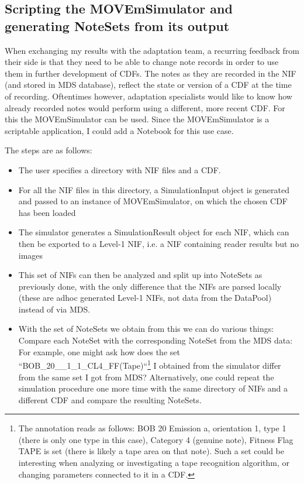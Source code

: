 \subsection{Scripting the MOVEmSimulator and generating NoteSets from its output}
When exchanging my results with the adaptation team, a recurring feedback from their side is that they need to be able to change note records in order to use them in further development of CDFs. The notes as they are recorded in the NIF (and stored in MDS database), reflect the state or version of a CDF at the time of recording. Oftentimes however, adaptation specialists would like to know how already recorded notes would perform using a different, more recent CDF. For this the MOVEmSimulator can be used. Since the MOVEmSimulator is a scriptable application, I could add a Notebook for this use case.\par
The steps are as follows:
\begin{itemize}
\item The user specifies a directory with NIF files and a CDF.
\item For all the NIF files in this directory, a SimulationInput object is generated and passed to an instance of MOVEmSimulator, on which the chosen CDF has been loaded
\item The simulator generates a SimulationResult object for each NIF, which can then be exported to a Level-1 NIF, i.e. a NIF containing reader results but no images
\item This set of NIFs can then be analyzed and split up into NoteSets as previously done, with the only difference that the NIFs are parsed locally (these are adhoc generated Level-1 NIFs, not data from the DataPool) instead of via MDS.
\item With the set of NoteSets we obtain from this we can do various things: Compare each NoteSet with the corresponding NoteSet from the MDS data: For example, one might ask how does the set ``BOB\_20\_\_1\_1\_CL4\_FF(Tape)``\footnote{The annotation reads as follows: BOB 20 Emission a, orientation 1, type 1 (there is only one type in this case), Category 4 (genuine note), Fitness Flag TAPE is set (there is likely a tape area on that note). Such a set could be interesting when analyzing or investigating a tape recognition algorithm, or changing parameters connected to it in a CDF.} I obtained from the simulator differ from the same set I got from MDS? Alternatively, one could repeat the simulation procedure one more time with the same directory of NIFs and a different CDF and compare the resulting NoteSets.
\end{itemize}
